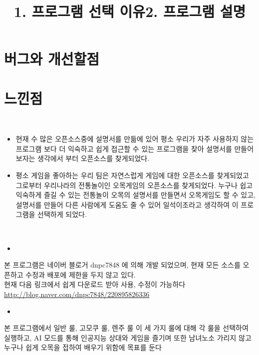 \documentclass[a4paper, 11pt]{article}
\begin{document}
	
	
	
	\vspace{1cm}
	\section{버그와 개선할점}
	
	\vspace{1cm}
	\section{느낀점}
	
	
   \newpage
	\title{\textbf{\Huge1. 프로그램 선택 이유}}\\
	
	{\Large
		\begin{itemize}
			\item 현재 수 많은 오픈소스중에 설명서를 만듦에 있어 평소 우리가 자주 사용하지 않는 프로그램 보다 더 익숙하고 쉽게 접근할 수 있는 프로그램을 찾아 설명서를 만들어 보자는 생각에서 부터 오픈소스를 찾게되었다.
			\item 평소 게임을 좋아하는 우리 팀은 자연스럽게 게임에 대한 오픈소스를 찾게되었고 그로부터 우리나라의 전통놀이인 오목게임의 오픈소스를 찾게되었다. 누구나 쉽고 익숙하게 즐길 수 있는 전통놀이 오목의 설명서를 만들면서 오목게임도 할 수 있고,설명서를 만들어 다른 사람에게 도움도 줄 수 있어 일석이조라고 생각하여  이 프로그램을 선택하게 되었다.
		\end{itemize}
	
	}


	\newpage
	\title{\textbf{\Huge2. 프로그램 설명}}\\
	\begin{itemize}
		\item {} 
	\end{itemize}
	{\Large
	본 프로그램은 네이버 블로거 dnpc7848 에 의해 개발 되었으며, 현재 모든 소스를 오픈하고 수정과 배포에 제한을 두지 않고 있다.\\
	현재 다음 링크에서 쉽게 다운로드 받아 사용, 수정이 가능하다\\
	\url{http://blog.naver.com/dnpc7848/220895826336}
	}
	\begin{itemize}
		\item {}
	\end{itemize}
	{\Large
		본 프로그램에서 일반 룰, 고모쿠 룰, 렌주 룰  이 세 가지 룰에 대해 각 룰을 선택하여 실행하고, AI 모드를 통해 인공지능 상대와 게임을 즐기며 또한 남녀노소 가리지 않고 누구나 쉽게 오목을 접하여 배우기 위함에 목표를 둔다
	}
\end{document}
